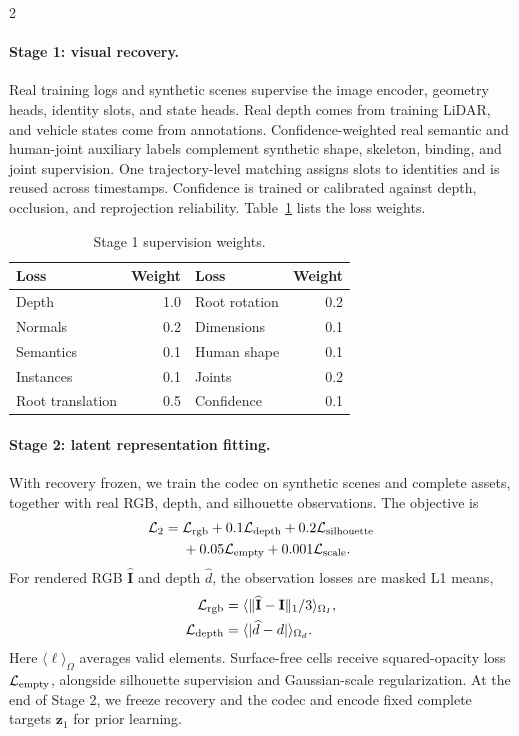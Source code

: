 \begin{multicols}{2}

\paragraph{Stage 1: visual recovery.}
Real training logs and synthetic scenes supervise the image encoder, geometry heads, identity slots, and state heads. Real depth comes from training LiDAR, and vehicle states come from annotations. Confidence-weighted real semantic and human-joint auxiliary labels complement synthetic shape, skeleton, binding, and joint supervision. One trajectory-level matching assigns slots to identities and is reused across timestamps. Confidence is trained or calibrated against depth, occlusion, and reprojection reliability. Table~\ref{tab:recovery-weights} lists the loss weights.

\begin{table}[H]
\centering\small
\caption{Stage 1 supervision weights.}
\label{tab:recovery-weights}
\begin{tabular}{@{}lrlr@{}}
\toprule
Loss & Weight & Loss & Weight \\
\midrule
Depth & 1.0 & Root rotation & 0.2 \\
Normals & 0.2 & Dimensions & 0.1 \\
Semantics & 0.1 & Human shape & 0.1 \\
Instances & 0.1 & Joints & 0.2 \\
Root translation & 0.5 & Confidence & 0.1 \\
\bottomrule
\end{tabular}
\end{table}

\paragraph{Stage 2: latent representation fitting.}
With recovery frozen, we train the codec on synthetic scenes and complete assets, together with real RGB, depth, and silhouette observations. The objective is
\begin{align}
\mathcal L_2={}&\mathcal L_{\rm rgb}+0.1\mathcal L_{\rm depth}
+0.2\mathcal L_{\rm silhouette}\nonumber\\
&+0.05\mathcal L_{\rm empty}+0.001\mathcal L_{\rm scale}.
\label{eq:codec-loss}
\end{align}
For rendered RGB $\widehat{\mathbf I}$ and depth $\widehat d$, the observation losses are masked L1 means,
\begin{align}
\mathcal L_{\rm rgb}&=\langle\|\widehat{\mathbf I}-\mathbf I\|_1/3\rangle_{\Omega_I},\\
\mathcal L_{\rm depth}&=\langle|\widehat d-d|\rangle_{\Omega_d}.
\label{eq:reconstruction-loss}
\end{align}
Here $\langle\ell\rangle_\Omega$ averages valid elements. Surface-free cells receive squared-opacity loss $\mathcal L_{\rm empty}$, alongside silhouette supervision and Gaussian-scale regularization. At the end of Stage 2, we freeze recovery and the codec and encode fixed complete targets $\mathbf z_1$ for prior learning.


\end{multicols}
